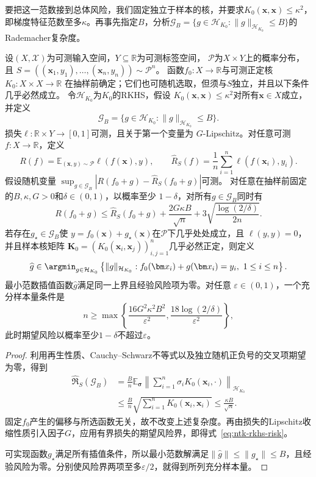 要把这一范数接到总体风险，我们固定独立于样本的核，并要求$K_0(\bm x,\bm x)\leq\kappa^2$，即梯度特征范数至多$\kappa$。再事先指定$B$，分析$\mathcal G_B=\{g\in\mathcal H_{K_0}:\|g\|_{\mathcal H_{K_0}}\leq B\}$的Rademacher复杂度。

\begin{theorem}[初始梯度特征的期望风险界]
\label{thm:ntk-rkhs-risk}
设$(X,\mathcal X)$为可测输入空间，$Y\subseteq\mathbb R$为可测标签空间，
$\mathcal P$为$X\times Y$上的概率分布，且
$S=((\bm x_1,y_1),\ldots,(\bm x_n,y_n))\sim\mathcal P^n$。
函数$f_0:X\to\mathbb R$与可测正定核$K_0:X\times X\to\mathbb R$
在抽样前确定；它们也可随机选取，但须与$S$独立，并且以下条件几乎必然成立。
令$\mathcal H_{K_0}$为$K_0$的RKHS，假设
$K_0(\bm x,\bm x)\leq\kappa^2$对所有$\bm x\in X$成立，并定义
\[
 \mathcal G_B=\{g\in\mathcal H_{K_0}:
                   \|g\|_{\mathcal H_{K_0}}\leq B\}.
\]
损失$\ell:\mathbb R\times Y\to[0,1]$可测，且关于第一个变量为
$G$-Lipschitz。对任意可测$f:X\to\mathbb R$，定义
\[
 R(f)=\mathbb E_{(\bm x,y)\sim\mathcal P}\ell(f(\bm x),y),\qquad
 \hat R_S(f)=\frac1n\sum_{i=1}^n\ell(f(\bm x_i),y_i).
\]
假设随机变量
$\sup_{g\in\mathcal G_B}|R(f_0+g)-\hat R_S(f_0+g)|$可测。
对任意在抽样前固定的$B,\kappa,G>0$和$\delta\in(0,1)$，以概率至少
$1-\delta$，对所有$g\in\mathcal G_B$同时有
\begin{equation}
 R(f_0+g)\leq\hat R_S(f_0+g)
       +\frac{2G\kappa B}{\sqrt n}
       +3\sqrt{\frac{\log(2/\delta)}{2n}}.
 \label{eq:ntk-rkhs-risk}
\end{equation}
若存在$g_\star\in\mathcal G_B$使
$y=f_0(\bm x)+g_\star(\bm x)$在$\mathcal P$下几乎处处成立，且
$\ell(y,y)=0$，并且样本核矩阵
$\bm K_0=(K_0(\bm x_i,\bm x_j))_{i,j=1}^n$几乎必然正定，则定义
\[
 \widehat g\in\argmin_{g\in\mathcal H_{K_0}}
 \left\{\|g\|_{\mathcal H_{K_0}}:
 f_0(\bm x_i)+g(\bm x_i)=y_i,\ 1\leq i\leq n\right\}.
\]
最小范数插值函数$\widehat g$满足同一上界且经验风险项为零。对任意
$\varepsilon\in(0,1)$，一个充分样本量条件是
\[
 n\geq\max\left\{\frac{16G^2\kappa^2B^2}{\varepsilon^2},
                  \frac{18\log(2/\delta)}{\varepsilon^2}\right\},
\]
此时期望风险以概率至少$1-\delta$不超过$\varepsilon$。
\end{theorem}
\begin{proof}
利用再生性质、Cauchy--Schwarz不等式以及独立随机正负号的交叉项期望为零，得到
\begin{align*}
 \widehat{\mathfrak R}_S(\mathcal G_B)
 &=\frac Bn\mathbb E_{\bm\sigma}
       \left\|\sum_{i=1}^n\sigma_i K_0(\bm x_i,\cdot)\right\|_{\mathcal H_{K_0}}\\
 &\leq\frac Bn\sqrt{\sum_{i=1}^nK_0(\bm x_i,\bm x_i)}
 \leq\frac{\kappa B}{\sqrt n}.
\end{align*}
固定$f_0$产生的偏移与所选函数无关，故不改变上述复杂度。再由损失的Lipschitz收缩性质引入因子$G$，应用有界损失的期望风险界，即得式~\eqref{eq:ntk-rkhs-risk}。

可实现函数$g_\star$满足所有插值条件，所以最小范数解满足$\|\widehat g\|\leq\|g_\star\|\leq B$，且经验风险为零。分别使风险界两项至多$\varepsilon/2$，就得到所列充分样本量。
\end{proof}

